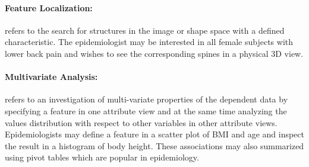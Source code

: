 \documentclass[journal]{style/vgtc} 			          %
\begin{document}
\paragraph{Feature Localization:} refers to the search for structures in the image or shape space with a defined characteristic.
%
The epidemiologist may be interested in all female subjects with lower back pain and wishes to see the corresponding spines in a physical 3D view.

\paragraph{Multivariate Analysis:} refers to an investigation of multi-variate properties of the dependent data by specifying a feature in one attribute view and at the same time analyzing the values distribution with respect to other variables in other attribute views.
%
Epidemiologists may define a feature in a scatter plot of BMI and age and inspect the result in a histogram of body height.
%
These associations may also summarized using pivot tables which are popular in epidemiology.
\end{document}
